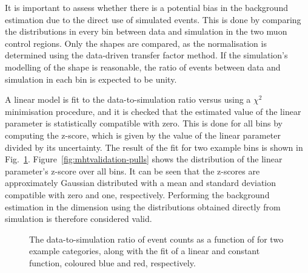 It is important to assess whether there is a potential bias in the background 
estimation due to the direct use of simulated events.
This is done by comparing the \mht distributions in every \njnbht bin between 
data and simulation in the two muon control regions. Only the shapes are 
compared, as the normalisation is determined using the data-driven transfer 
factor method. If the simulation's modelling of the \mht shape is reasonable, 
the ratio of events between data and simulation in each \mht bin is expected to 
be unity.

A linear model is fit to the data-to-simulation ratio versus \mht using a 
$\chi^2$ minimisation procedure, and it is checked that the estimated value of 
the linear parameter is statistically compatible with zero. This is done for 
all \njnbht bins by computing the z-score, which is given by the value of the 
linear parameter divided by its uncertainty. The result of the fit for two 
example \njnbht bins is shown in Fig.~\ref{fig:mhtvalidation-fits}. 
Figure~\ref{fig:mhtvalidation-pulls} shows the distribution of the linear 
parameter's z-score over all \njnbht bins. 
It can be seen that the z-scores are approximately Gaussian distributed with a 
mean and standard deviation compatible with zero and one, respectively.
Performing the background estimation in the \mht dimension using the 
distributions obtained directly from simulation is therefore considered valid.

\begin{figure}[!h]
\centering
{}
\caption{The data-to-simulation ratio of event counts as a function of \mht for 
two example \njnbht categories, along with the fit of a linear and constant 
function, coloured blue and red, respectively.}
\label{fig:mhtvalidation-fits}
\end{figure}

